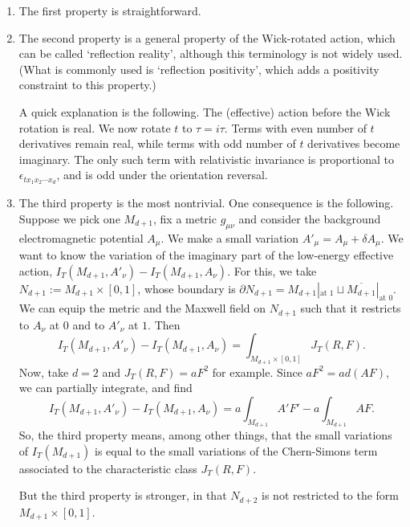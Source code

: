 \documentclass[12pt]{article}
\numberwithin{equation}{section}
\numberwithin{figure}{section}
\theoremstyle{remark}
\begin{document}
\begin{enumerate}
\item The first property is straightforward. 
\item The second property is a general property of the Wick-rotated action,
which can be called `reflection reality', although this terminology is not widely used.
(What is commonly used is `reflection positivity', which adds a positivity constraint to this property.)

A quick explanation is the following. 
The (effective) action before the Wick rotation is real.
We now rotate $t$ to $\tau = i\tau$. 
Terms with even number of $t$ derivatives remain real,
while terms with odd number of $t$ derivatives become imaginary.
The only such term with relativistic invariance is proportional to $\epsilon_{t x_1 x_2\cdots x_d}$,
and is odd under the orientation reversal.

\item The third property is the most nontrivial.
One consequence is the following. 
Suppose we pick one $M_{d+1}$, fix a metric $g_{\mu\nu}$ and 
consider the background electromagnetic potential $A_{\mu}$. 
We make a small variation  $A'_\mu=A_\mu + \delta A_\mu$.
We want to know the variation of the imaginary part of the low-energy effective action,
$I_T(M_{d+1},A'_\nu)
-I_T(M_{d+1},A_\nu)$.
For this, we take $N_{d+1}:=M_{d+1} \times [0,1]$,
whose boundary is $\partial N_{d+1} = M_{d+1}|_\text{at $1$} \sqcup  \overline{M_{d+1}}|_\text{at $0$}$.
We can equip the metric and the Maxwell field on $N_{d+1}$ 
such that it restricts to  $A_\nu$ at $0$ 
and to  $A'_\nu$ at $1$.
Then \begin{equation}
I_T(M_{d+1},A'_\nu)
-I_T(M_{d+1},A_\nu) = \int_{M_{d+1}\times [0,1]} J_T(R,F).
\end{equation} 
Now,  take $d=2$ and $J_T(R,F)= a F^2$ for example. Since $a F^2 = a d(A F)$, we can partially integrate, and find \begin{equation}
I_T(M_{d+1},A'_\nu) - I_T(M_{d+1},A_\nu)
= a \int_{M_{d+1}} A'F' - a \int_{M_{d+1}} AF.
\end{equation}
So, the third property means, among other things, 
that the small variations of $I_T(M_{d+1})$ is equal to the small variations of 
the Chern-Simons term associated to the characteristic class $J_T(R,F)$.

But the third property is stronger, in that $N_{d+2}$ is not restricted to the form $M_{d+1}\times [0,1]$.
\end{enumerate}
\end{document}
